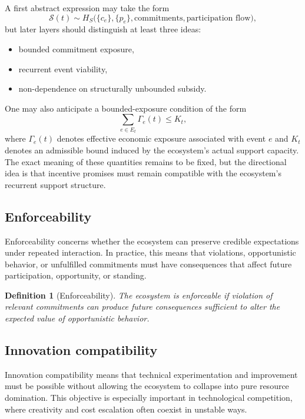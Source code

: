 \documentclass[11pt]{article}
\newtheorem{definition}{Definition}
\begin{document}
A first abstract expression may take the form
\[
\mathcal{S}(t) \sim H_S\big(\{c_e\}, \{p_e\}, \text{commitments}, \text{participation flow}\big),
\]
but later layers should distinguish at least three ideas:
\begin{itemize}
  \item bounded commitment exposure,
  \item recurrent event viability,
  \item non-dependence on structurally unbounded subsidy.
\end{itemize}

One may also anticipate a bounded-exposure condition of the form
\[
\sum_{e \in E_t} \Gamma_e(t) \leq K_t,
\]
where \(\Gamma_e(t)\) denotes effective economic exposure associated with event \(e\) and \(K_t\) denotes an admissible bound induced by the ecosystem's actual support capacity. The exact meaning of these quantities remains to be fixed, but the directional idea is that incentive promises must remain compatible with the ecosystem's recurrent support structure.

\subsection{Enforceability}

Enforceability concerns whether the ecosystem can preserve credible expectations under repeated interaction. In practice, this means that violations, opportunistic behavior, or unfulfilled commitments must have consequences that affect future participation, opportunity, or standing.

\begin{definition}[Enforceability]
The ecosystem is enforceable if violation of relevant commitments can produce future consequences sufficient to alter the expected value of opportunistic behavior.
\end{definition}

\subsection{Innovation compatibility}

Innovation compatibility means that technical experimentation and improvement must be possible without allowing the ecosystem to collapse into pure resource domination. This objective is especially important in technological competition, where creativity and cost escalation often coexist in unstable ways.
\end{document}
